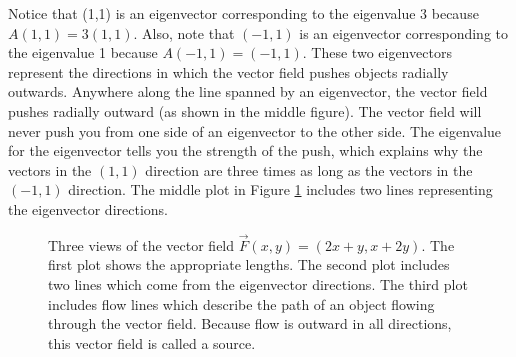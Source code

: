 \begin{example}
Notice that (1,1) is an eigenvector corresponding to the eigenvalue 3 because $A(1,1) = 3(1,1)$. 
Also, note that $(-1,1)$ is an eigenvector corresponding to the eigenvalue 1 because $A(-1,1)=(-1,1)$. 
These two eigenvectors represent the directions in which the vector field pushes objects radially outwards.   %
Anywhere along the line spanned by an eigenvector, the vector field pushes radially outward (as shown in the middle figure).  The vector field will never push you from one side of an eigenvector to the other side.
The eigenvalue for the eigenvector tells you the strength of the push, which explains why the vectors in the $(1,1)$ direction are three times as long as the vectors in the $(-1,1)$ direction. 
The middle plot in Figure \ref{vf2112} includes two lines representing the eigenvector directions.

\begin{figure}[bth]
\caption{\label{vf2112} Three views of the vector field $\vec F(x,y) =(2x+y,x+2y)$. The first plot shows the appropriate lengths.  The second plot includes two lines which come from the eigenvector directions. The third plot includes flow lines which describe the path of an object flowing through the vector field. Because flow is outward in all directions, this vector field is called a source.}
\end{figure}


\end{example}
